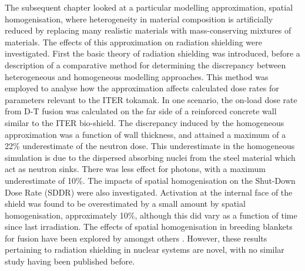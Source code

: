 The subsequent chapter looked at a particular modelling approximation, spatial homogenisation, where heterogeneity in material composition is artificially reduced by replacing many realistic materials with mass-conserving mixtures of materials. The effects of this approximation on radiation shielding were investigated. First the basic theory of radiation shielding was introduced, before a description of a comparative method for determining the discrepancy between heterogeneous and homogeneous modelling approaches. This method was employed to analyse how the approximation affects calculated dose rates for parameters relevant to the ITER tokamak. In one scenario, the on-load dose rate from D-T fusion was calculated on the far side of a reinforced concrete wall similar to the ITER bio-shield. The discrepancy induced by the homogeneous approximation was a function of wall thickness, and attained a maximum of a 22\% underestimate of the neutron dose. This underestimate in the homogeneous simulation is due to the dispersed absorbing nuclei from the steel material which act as neutron sinks. There was less effect for photons, with a maximum underestimate of 10\%. The impacts of spatial homogenisation on the Shut-Down Dose Rate (SDDR) were also investigated. Activation at the internal face of the shield was found to be overestimated by a small amount by spatial homogenisation, approximately 10\%, although this did vary as a function of time since last irradiation. The effects of spatial homogenisation in breeding blankets for fusion have been explored by \citeauthor{Pelloni1989} amongst others \cite{Kumar1989}. However, these results pertaining to radiation shielding in nuclear systems are novel, with no similar study having been published before. 

